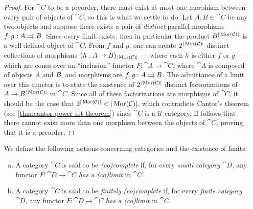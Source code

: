 \begin{proof}
For \(\cat C\) to be a preorder, there must exist at most one morphism between
every pair of objects of \(\cat C\), so this is what we settle to do. Let
\(A, B \in \cat C\) be any two objects and suppose there exists a pair of
\emph{distinct} parallel morphisms \(f, g: A \rightrightarrows B\). Since every limit
exists, then in particular the product \(B^{|\operatorname{Mor}(\mathcal C)|}\) is a well defined
object of \(\cat C\). From \(f\) and \(g\), one can create
\(2^{|\operatorname{Mor}(\mathcal C)|}\) distinct collections of morphisms
\((h: A \to B)_{|\operatorname{Mor}(\mathcal C)|}\) --- where each \(h\) is either \(f\) or \(g\)
--- which are cones over an ``inclusion'' functor \(F: \cat A \to \cat C\),
where \(\cat A\) is composed of objects \(A\) and \(B\), and morphisms are
\(f, g: A \rightrightarrows B\). The admittance of a limit over this functor is to state the
existence of \(2^{|\operatorname{Mor}(\mathcal C)|}\) distinct factorizations of
\(A \to B^{|\operatorname{Mor}(\mathcal C)|}\) in \(\cat C\). Since all of these factorizations
are morphisms of \(\cat C\), it should be the case that
\(2^{|\operatorname{Mor}(\mathcal C)|} < |\operatorname{Mor}(\mathcal C)|\), which contradicts Cantor's theorem (see
\cref{thm:cantor-power-set-theorem}) since \(\cat C\) is a
\(\mathcal{U}\)-category. If follows that there cannot exist more than one
morphism between the objects of \(\cat C\), proving that it is a preorder.
\end{proof}

\begin{definition}[Completeness]
\label{def:completeness-categories}
We define the following notions concerning categories and the existence of
limits:
\begin{enumerate}[(a)]\setlength\itemsep{0em}
\item A category \(\cat C\) is said to be \emph{(co)complete} if, for every
  \emph{small category} \(\cat D\), any functor \(F: \cat D \to \cat C\)
  \emph{has a (co)limit} in \(\cat C\).

\item A category \(\cat C\) is said to be \emph{finitely (co)complete} if, for
  every \emph{finite category} \(\cat D\), any functor \(F: \cat D \to \cat C\)
  \emph{has a (co)limit} in \(\cat C\).
\end{enumerate}
\end{definition}